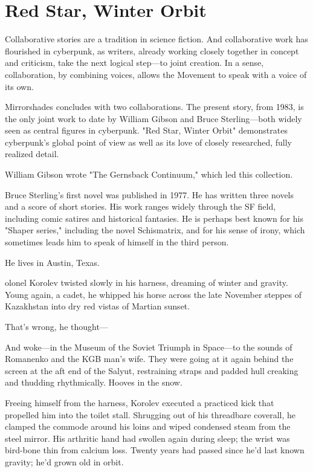 \chapter{Red Star, Winter Orbit}

Collaborative stories are a tradition in science fiction. And collaborative work has flourished in cyberpunk, as writers, already working closely together in concept and criticism, take the next logical step—to joint creation. In a sense, collaboration, by combining voices, allows the Movement to speak with a voice of its own.

Mirrorshades concludes with two collaborations. The present story, from 1983, is the only joint work to date by William Gibson and Bruce Sterling—both widely seen as central figures in cyberpunk. "Red Star, Winter Orbit" demonstrates cyberpunk's global point of view as well as its love of closely researched, fully realized detail.

William Gibson wrote "The Gernsback Continuum," which led this collection.

Bruce Sterling's first novel was published in 1977. He has written three novels and a score of short stories. His work ranges widely through the SF field, including comic satires and historical fantasies. He is perhaps best known for his "Shaper series," including the novel Schismatrix, and for his sense of irony, which sometimes leads him to speak of himself in the third person.

He lives in Austin, Texas.

\hrulefill

olonel Korolev twisted slowly in his harness, dreaming of winter and gravity. Young again, a cadet, he whipped his horse across the late November steppes of Kazakhstan into dry red vistas of Martian sunset.

That’s wrong, he thought—

And woke—in the Museum of the Soviet Triumph in Space—to the sounds of Romanenko and the KGB man’s wife. They were going at it again behind the screen at the aft end of the Salyut, restraining straps and padded hull creaking and thudding rhythmically. Hooves in the snow.

Freeing himself from the harness, Korolev executed a practiced kick that propelled him into the toilet stall. Shrugging out of his threadbare coverall, he clamped the commode around his loins and wiped condensed steam from the steel mirror. His arthritic hand had swollen again during sleep; the wrist was bird-bone thin from calcium loss. Twenty years had passed since he’d last known gravity; he’d grown old in orbit.

